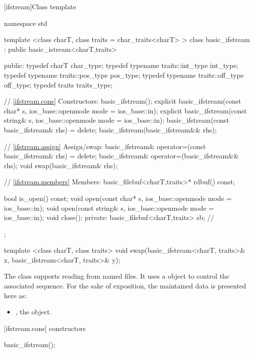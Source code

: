 [ifstream]{Class template }

%
\begin{codeblock}
namespace std {
  template <class charT, class traits = char_traits<charT> >
  class basic_ifstream : public basic_istream<charT,traits> {
  public:
    typedef charT                     char_type;
    typedef typename traits::int_type int_type;
    typedef typename traits::pos_type pos_type;
    typedef typename traits::off_type off_type;
    typedef traits                    traits_type;

    // \ref{ifstream.cons} Constructors:
    basic_ifstream();
    explicit basic_ifstream(const char* s,
        ios_base::openmode mode = ios_base::in);
    explicit basic_ifstream(const string& s,
        ios_base::openmode mode = ios_base::in);
    basic_ifstream(const basic_ifstream& rhs) = delete;
    basic_ifstream(basic_ifstream&& rhs);

    // \ref{ifstream.assign} Assign/swap:
    basic_ifstream& operator=(const basic_ifstream& rhs) = delete;
    basic_ifstream& operator=(basic_ifstream&& rhs);
    void swap(basic_ifstream& rhs);

    // \ref{ifstream.members} Members:
    basic_filebuf<charT,traits>* rdbuf() const;

    bool is_open() const;
    void open(const char* s, ios_base::openmode mode = ios_base::in);
    void open(const string& s, ios_base::openmode mode = ios_base::in);
    void close();
  private:
    basic_filebuf<charT,traits> sb; // \exposr
  };

  template <class charT, class traits>
  void swap(basic_ifstream<charT, traits>& x,
            basic_ifstream<charT, traits>& y);
}
\end{codeblock}

\pnum
The class
supports reading from named files.
It uses a
object to control the associated
sequence.
For the sake of exposition, the maintained data is presented here as:

\begin{itemize}
\item
{}, the  object.
\end{itemize}

[ifstream.cons]{ constructors}

%
\begin{itemdecl}
basic_ifstream();
\end{itemdecl}

